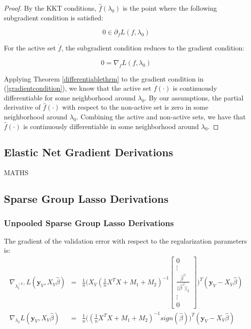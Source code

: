 \documentclass[10pt,letterpaper]{article}
\begin{document}
\begin{proof}
By the KKT conditions, $\hat f(\lambda_0)$ is the point where the following subgradient condition is satisfied:

\begin{equation}
0 \in \partial_f L(f, \lambda_0)
\end{equation}

For the active set $\dot f$, the subgradient condition reduces to the gradient condition:

\begin{equation}
0 = \nabla_{\dot f} L(f, \lambda_0)
\label{gradientcondition}
\end{equation}

Applying Theorem \ref{differentiablethrm} to the gradient condition in (\ref{gradientcondition}), we know that the active set $\dot f(\cdot)$ is continuously differentiable for some neighborhood around $\lambda_0$. By our assumptions, the partial derivative of $\hat f(\cdot)$ with respect to the non-active set is zero in some neighborhood around $\lambda_0$. Combining the active and non-active sets, we have that $\hat f(\cdot)$ is continuously differentiable in some neighborhood around $\lambda_0$.

\end{proof}


\subsection{Elastic Net Gradient Derivations}
MATHS

\subsection{Sparse Group Lasso Derivations}

\subsubsection{Unpooled Sparse Group Lasso Derivations}
The gradient of the validation error with respect to the regularization parameters is:
\begin{equation}
\begin{array}{lcl}
\nabla_{\lambda_1^{(k)}} L(\boldsymbol y_V, X_V \hat \beta) &=& 
\frac{1}{n}
\Bigg (
X_V
(\frac{1}{n} X^T X + M_1 + M_2)^{-1}
\begin{bmatrix}
0 \\
\vdots \\
\frac{\hat\beta^{(l}}{||\hat\beta^{(l}||_2}\\
\vdots\\
0
\end{bmatrix}
\Bigg )^T
(\boldsymbol y_V - X_V \hat \beta)
 \\
\nabla_{\lambda_2} L(\boldsymbol y_V, X_V \hat \beta) &=&
\frac{1}{n}
\Bigg (
(\frac{1}{n} X^T X + M_1 + M_2)^{-1} sign(\hat \beta)
\Bigg )^T
(\boldsymbol y_V - X_V \hat \beta)
\\ 
\end{array}
\end{equation}
\end{document}
